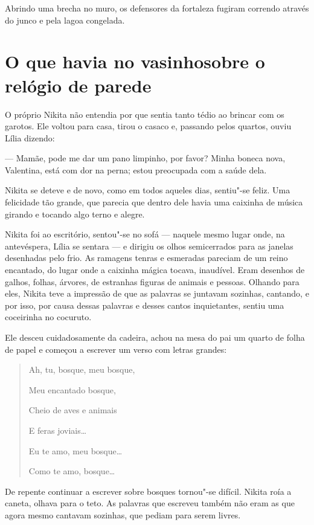 Abrindo uma brecha no muro, os defensores da fortaleza fugiram
correndo através do junco e pela lagoa congelada.

\chapter{O que havia no vasinho\break sobre o relógio de parede}

O próprio Nikita não entendia por que sentia tanto tédio ao brincar com
os garotos. Ele voltou para casa, tirou o casaco e, passando pelos
quartos, ouviu Lília dizendo:

--- Mamãe, pode me dar um pano limpinho, por favor? Minha boneca nova,
Valentina, está com dor na perna; estou preocupada com a saúde dela.

Nikita se deteve e de novo, como em todos aqueles dias, sentiu"-se
feliz. Uma felicidade tão grande, que parecia que dentro dele havia uma
caixinha de música girando e tocando algo terno e alegre.

Nikita foi ao escritório, sentou"-se no sofá --- naquele mesmo lugar onde,
na antevéspera, Lília se sentara --- e dirigiu os olhos semicerrados
para as janelas desenhadas pelo frio. As ramagens tenras e
esmeradas pareciam de um reino encantado, do lugar onde a caixinha
mágica tocava, inaudível. Eram desenhos de galhos, folhas, árvores, de
estranhas figuras de animais e pessoas. Olhando para eles, Nikita teve a
impressão de que as palavras se juntavam sozinhas, cantando, e por isso,
por causa dessas palavras e desses cantos inquietantes, sentiu uma
coceirinha no cocuruto.

Ele desceu cuidadosamente da cadeira, achou na mesa do pai um quarto de
folha de papel e começou a escrever um verso com letras grandes:

\begin{quotation}
Ah, tu, bosque, meu bosque,

Meu encantado bosque,

Cheio de aves e animais

E feras joviais\ldots{}

Eu te amo, meu bosque\ldots{}

Como te amo, bosque\ldots{}
\end{quotation}

De repente continuar a escrever sobre bosques tornou"-se difícil. Nikita
roía a caneta, olhava para o teto. As palavras que escreveu também não
eram as que agora mesmo cantavam sozinhas, que pediam para serem livres.

